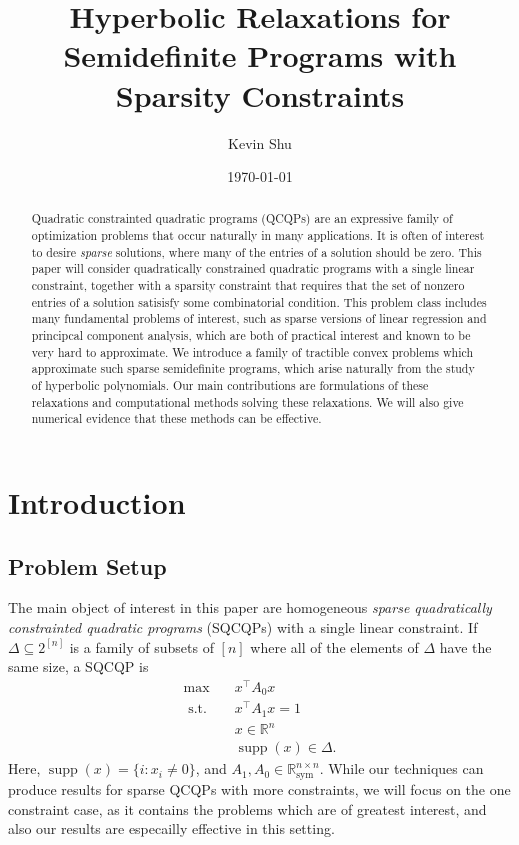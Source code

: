 \documentclass{amsart}
\title{Hyperbolic Relaxations for Semidefinite Programs with Sparsity Constraints}
\date{\today}
\author{Kevin Shu}
\theoremstyle{definition}
\newcommand{\R}{\mathbb{R}}
\DeclareMathOperator*{\supp}{supp}
\newcommand{\st}{{\text{ s.t. }}}
\newcommand*{\Sym}{\R^{n \times n}_{\mathrm{sym}}}
\begin{document}
\begin{abstract}
    Quadratic constrainted quadratic programs (QCQPs) are an expressive family of optimization problems that occur naturally in many applications.
    It is often of interest to desire \emph{sparse} solutions, where many of the entries of a solution should be zero.
    This paper will consider quadratically constrained quadratic programs with a single linear constraint, together with a sparsity constraint that requires that the set of nonzero entries of a solution satisisfy some combinatorial condition.
    This problem class includes many fundamental problems of interest, such as sparse versions of linear regression and principcal component analysis, which are both of practical interest and known to be very hard to approximate.
    We introduce a family of tractible convex problems which approximate such sparse semidefinite programs, which arise naturally from the study of hyperbolic polynomials.
    Our main contributions are formulations of these relaxations and computational methods solving these relaxations.
    We will also give numerical evidence that these methods can be effective.
\end{abstract}

\maketitle

\section{Introduction}
\subsection{Problem Setup}
The main object of interest in this paper are homogeneous \emph{sparse quadratically constrainted quadratic programs} (SQCQPs) with a single linear constraint. If $\Delta \subseteq 2^{[n]}$ is a family of subsets of $[n]$ where all of the elements of $\Delta$ have the same size, a SQCQP is
\begin{equation}\label{eq:sparse_qcqp}
    \begin{aligned}
        \max\quad & x^{\intercal}A_0x\\
        \st & x^{\intercal}A_1x = 1\\
            & x \in \R^n\\
            &\supp(x) \in \Delta.
    \end{aligned}
    \tag{$P$}
\end{equation}
Here, $\supp(x) = \{i : x_i \neq 0\}$, and $A_1, A_0 \in \Sym$.
While our techniques can produce results for sparse QCQPs with more constraints, we will focus on the one constraint case, as it contains the problems which are of greatest interest, and also our results are especailly effective in this setting.
\end{document}

